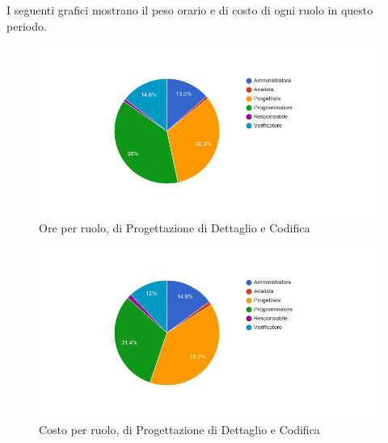 I seguenti grafici mostrano il peso orario e di costo di ogni ruolo in questo periodo.

\begin{figure}[H]
  \begin{center}
    \includegraphics[width=15cm]{res/img/prospettoEconomico/orePerRuoloProgettazioneDettaglioCodifica.png}
  \caption{Ore per ruolo,  di Progettazione di Dettaglio e Codifica}
  \end{center} 
\end{figure}  

\begin{figure}[H]
  \begin{center}
    \includegraphics[width=15cm]{res/img/prospettoEconomico/costoPerRuoloProgettazioneDettaglioCodifica.png}
  \caption{Costo per ruolo,  di Progettazione di Dettaglio e Codifica}
  \end{center} 
\end{figure}  


